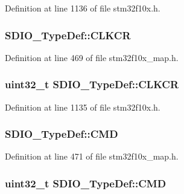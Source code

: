 Definition at line 1136 of file stm32f10x.\+h.

\subsubsection[{\texorpdfstring{C\+L\+K\+CR}{CLKCR}}]{ S\+D\+I\+O\+\_\+\+Type\+Def\+::\+C\+L\+K\+CR}\hypertarget{struct_s_d_i_o___type_def_a6076fc70af4f48cbd2bdace51a0e9345}{}\label{struct_s_d_i_o___type_def_a6076fc70af4f48cbd2bdace51a0e9345}


Definition at line 469 of file stm32f10x\+\_\+map.\+h.

\subsubsection[{\texorpdfstring{C\+L\+K\+CR}{CLKCR}}]{ {\bf uint32\+\_\+t} S\+D\+I\+O\+\_\+\+Type\+Def\+::\+C\+L\+K\+CR}\hypertarget{struct_s_d_i_o___type_def_aeb1e30ce2038628e45264f75e5e926bb}{}\label{struct_s_d_i_o___type_def_aeb1e30ce2038628e45264f75e5e926bb}


Definition at line 1135 of file stm32f10x.\+h.

\subsubsection[{\texorpdfstring{C\+MD}{CMD}}]{ S\+D\+I\+O\+\_\+\+Type\+Def\+::\+C\+MD}\hypertarget{struct_s_d_i_o___type_def_a324ba84e6ff0e47d805d676757e2cd4a}{}\label{struct_s_d_i_o___type_def_a324ba84e6ff0e47d805d676757e2cd4a}


Definition at line 471 of file stm32f10x\+\_\+map.\+h.

\subsubsection[{\texorpdfstring{C\+MD}{CMD}}]{ {\bf uint32\+\_\+t} S\+D\+I\+O\+\_\+\+Type\+Def\+::\+C\+MD}\hypertarget{struct_s_d_i_o___type_def_abbbdc3174e12dab21123d746d65f345d}{}\label{struct_s_d_i_o___type_def_abbbdc3174e12dab21123d746d65f345d}



